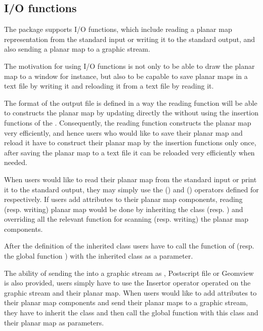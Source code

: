 \begin{ccAdvanced}

\end{ccAdvanced}
\begin{ccAdvanced}
\subsection*{I/O functions}
The  package supports I/O functions, which include reading a planar map representation from 
the standard input or writing it to the standard output, 
and also sending a planar map to a graphic stream.

The motivation for using I/O functions is not only to be able to draw 
the planar map to a window for instance, 
but also to be capable to save planar maps in a text file by writing it 
and reloading it from a text file by reading it. 

The format of the output file is defined in a way the reading function will be 
able to constructs the planar map by updating directly the  without 
using the insertion functions of the . 
Consequently, the reading function constructs the planar map very 
efficiently, and hence users who would like to save their planar map and reload 
it have to construct their planar map by the insertion functions only once, 
after saving the planar map to a text file it can be reloaded very efficiently 
when needed.

When users would like to read their planar map from the standard input or print 
it to the standard output, they may simply use the  (\ccc{ >> }) 
and  (\ccc{ << }) operators defined for  
respectively. 
If users add attributes to their planar map components, reading (resp. writing) planar map would 
be done by inheriting the class  (resp.  ) 
and overriding all the relevant function for scanning (resp. writing) 
the planar map components. 

After the definition of the inherited class users have to call the function 
 of  (resp. the global function  ) with the inherited class as a parameter.

The ability of sending the  into a graphic stream as 
, Postscript file or Geomview is also provided, 
users simply have to use the Insertor operator operated on the graphic stream and their planar map. 
When users would like to add attributes to their planar map components and 
send their planar maps to a graphic stream, they have to inherit the class 
 and then call the global function  
with this class and their planar map as parameters.


\end{ccAdvanced}
